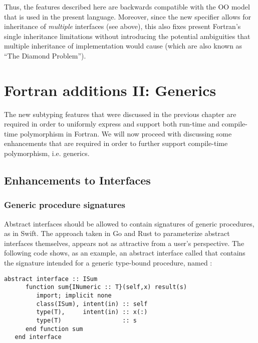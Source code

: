 \documentclass[11pt,oneside]{report}
\newcommand{\code}[1]{{\selectfont\ttfamily{#1}}}
\begin{document}
Thus, the features described here are backwards compatible with the OO
model that is used in the present language. Moreover, since the new
\code{implements} specifier allows for inheritance of \emph{multiple}
interfaces (see above), this also fixes present Fortran's single
inheritance limitations without introducing the potential ambiguities
that multiple inheritance of implementation would cause (which are
also known as ``The Diamond Problem'').


\chapter{Fortran additions II: Generics}

The new subtyping features that were discussed in the previous chapter
are required in order to uniformly express and support both run-time
and compile-time polymorphism in Fortran. We will now proceed with
discussing some enhancements that are required in order to further
support compile-time polymorphism, i.e. generics.

\section{Enhancements to Interfaces}

\subsection{Generic procedure signatures} 
\label{sect:generic_interfaces}

Abstract interfaces should be allowed to contain signatures of generic
procedures, as in Swift. The approach taken in Go and Rust to
parameterize abstract interfaces themselves, appears not as attractive
from a user's perspective. The following code shows, as an example, an
abstract interface called \code{ISum} that contains the signature
intended for a generic type-bound procedure, named \code{sum}:
\begin{lstlisting}[language=LFortran,style=boxed]
   abstract interface :: ISum
      function sum{INumeric :: T}(self,x) result(s)
         import; implicit none
         class(ISum), intent(in) :: self
         type(T),     intent(in) :: x(:)
         type(T)                 :: s
      end function sum
   end interface
\end{lstlisting}
\end{document}
